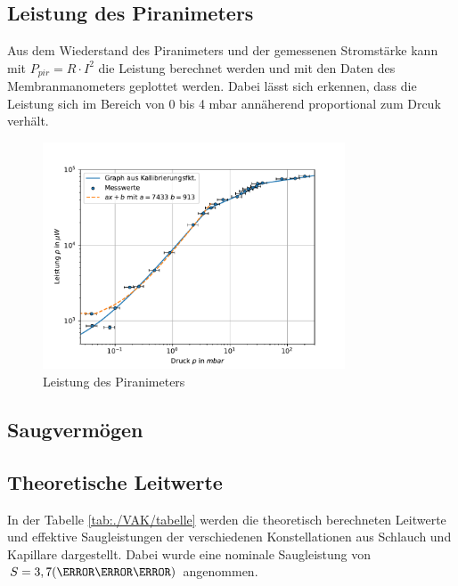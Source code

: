 \documentclass[11pt, a4paper]{article}
\begin{document}
    \subsection{Leistung des Piranimeters}
    Aus dem Wiederstand des Piranimeters und der gemessenen Stromstärke kann mit $P_{pir} = R \cdot I^2$ die Leistung berechnet werden und mit den Daten des Membranmanometers geplottet werden. Dabei lässt sich erkennen, dass die Leistung sich im Bereich von 0 bis 4 \si{\milli\bar} annäherend proportional zum Drcuk verhält. 
    \begin{figure}[h]
        \centering
        \includegraphics[width=0.8\textwidth]{VAK/Pp_Graph.pdf}
        \caption{Leistung des Piranimeters}
        \label{fig:Pzup}
    \end{figure}

    \subsection{Saugvermögen}

    \subsection{Theoretische Leitwerte}
    In der Tabelle \ref{tab:./VAK/tabelle} werden die theoretisch berechneten Leitwerte und effektive Saugleistungen der verschiedenen Konstellationen aus Schlauch und Kapillare dargestellt. Dabei wurde eine nominale Saugleistung von $S = 3,7 \si(\meter\per\hour)$ angenommen.
    
\end{document}
